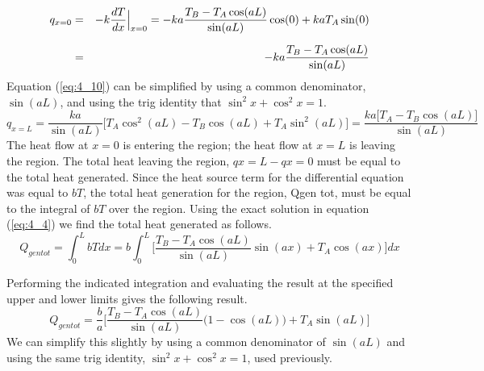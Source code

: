 \documentclass[12pt]{report}
\newcommand{\sps}{\\[0.2cm]}
\newcommand{\refn}[1]{(\ref{#1})}
\newcommand{\refx}[1]{\refn{eq:#1}}
\newcommand{\NI}{\noindent}
\begin{document}
	\begin{eqnarray}
		q_{x=0} &=& -k\frac{dT}{dx}\Big|_{x=0} = -ka\frac{T_B - T_A\cos(aL)}{\sin(aL)}\cos(0) + kaT_A\sin(0)\notag \sps
		&=& -ka\frac{T_B - T_A\cos(aL)}{\sin(aL)} \label{eq:4_11}
	\end{eqnarray}
	Equation \refx{4_10} can be simplified by using a common denominator, $\sin(aL)$, and using the trig identity that $\sin^2x + \cos^2x = 1$.
	\begin{equation}
		q_{x=L} = \frac{ka}{\sin(aL)}\Big[T_A\cos^2(aL) - T_B\cos(aL) + T_A\sin^2(aL)\Big] = \frac{ka\big[T_A - T_B\cos(aL)\big]}{\sin(aL)}\label{eq:4_12}
	\end{equation}
	The heat flow at $x = 0$ is entering the region; the heat flow at $x = L$ is leaving the region. The total heat leaving the region, $qx = L-qx = 0$ must be equal to the total heat generated. Since the heat source term for the differential equation was equal to $bT$, the total heat generation for the region, Qgen tot, must be equal to the integral of $bT$ over the region. Using the exact solution in equation \refx{4_4} we find the total heat generated as follows.
	\begin{equation}
		Q_{gen tot} = \int_0^L bTdx = b\int_0^L\Biggl[\frac{T_B - T_A\cos(aL)}{\sin(aL)}\sin(ax) + T_A\cos(ax)\Biggr]dx \label{eq:4_13}
	\end{equation}
	
	\NI Performing the indicated integration and evaluating the result at the specified upper and lower limits gives the following result.
	\begin{equation}
		Q_{gen tot} = \frac{b}{a}\Biggl[\frac{T_B - T_A\cos(aL)}{\sin(aL)}\Big(1-\cos(aL)\Big)+ T_A\sin(aL)\Biggr]\label{eq:4_14}
	\end{equation}
	We can simplify this slightly by using a common denominator of $\sin(aL)$ and using the same trig identity, $\sin^2x + \cos^2x = 1$, used previously.
	
\end{document}
